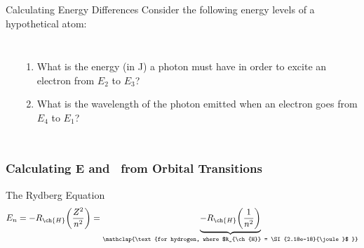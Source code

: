 \documentclass[handout,notes=hide]{beamer}
\begin{document}
\begin{frame}{Calculating Energy Differences}
	Consider the following energy levels of a hypothetical atom:

	\begin{columns}
		\begin{center}
		\end{center}
		\begin{enumerate}
			\item What is the energy (in \si{\joule}) a photon must
				have in order to excite an electron from $E_2$
				to $E_3$?
			\item What is the wavelength of the photon emitted when
				an electron goes from $E_4$ to $E_1$?
		\end{enumerate}
	\end{columns}
\end{frame}

\begin{frame}[t]
	\frametitle{Calculating E and \textlambda\ from Orbital Transitions}
	\begin{block}{The Rydberg Equation}
		\begin{align*}
			E_n = -R_{\ch{H}}\bigg(\frac{Z^2}{n^2}\bigg)
			=
			\underbrace{-R_{\ch{H}}\bigg(\frac{1}{n^2}\bigg)}_{\mathclap{\text{for
			hydrogen, where $R_{\ch{H}} = \SI{2.18e-18}{\joule}$ 
}}}
		\end{align*}
	\end{block}

\end{frame}
\end{document}
